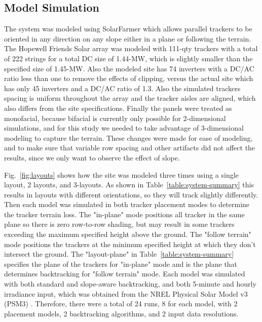 \documentclass[conference]{IEEEtran}
\begin{document}
\subsection{Model Simulation}

The system was modeled using SolarFarmer \cite{Mikofski_8547323} which allows parallel trackers to be oriented in any direction on any slope either in a plane or following the terrain. The Hopewell Friends Solar array was modeled with 111-qty trackers with a total of 222 strings for a total DC size of 1.44-MW, which is slightly smaller than the specified size of 1.45-MW. Also the modeled site has 74 inverters with a DC/AC ratio less than one to remove the effects of clipping, versus the actual site which has only 45 inverters and a DC/AC ratio of 1.3. Also the simulated trackers spacing is uniform throughout the array and the tracker aisles are aligned, which also differs from the site specifications. Finally the panels were treated as monofacial, because bifacial is currently only possible for 2-dimensional simulations, and for this study we needed to take advantage of 3-dimensional modeling to capture the terrain. These changes were made for ease of modeling, and to make sure that variable row spacing and other artifacts did not affect the results, since we only want to observe the effect of slope.

Fig.~\ref{fig:layouts} shows how the site was modeled three times using a single layout, 2 layouts, and 3-layouts. As shown in Table~\ref{table:system-summary} this results in layouts with different orientations, so they will track slightly differently. Then each model was simulated in both tracker placement modes to determine the tracker terrain loss. The "in-plane" mode positions all tracker in the same plane so there is zero row-to-row shading, but may result in some trackers exceeding the maximum specified height above the ground. The "follow terrain" mode positions the trackers at the minimum specified height at which they don't intersect the ground. The "layout-plane" in Table~\ref{table:system-summary} specifies the plane of the trackers for "in-plane" mode and is the plane that determines backtracking for "follow terrain" mode. Each model was simulated with both standard \cite{Marion2013} and slope-aware \cite{Anderson2020} backtracking, and both 5-minute and hourly irradiance input, which was obtained from the NREL Physical Solar Model v3 (PSM3) \cite{Sengupta2018}. Therefore, there were a total of 24 runs, 8 for each model, with 2 placement models, 2 backtracking algorithms, and 2 input data resolutions.
\end{document}
